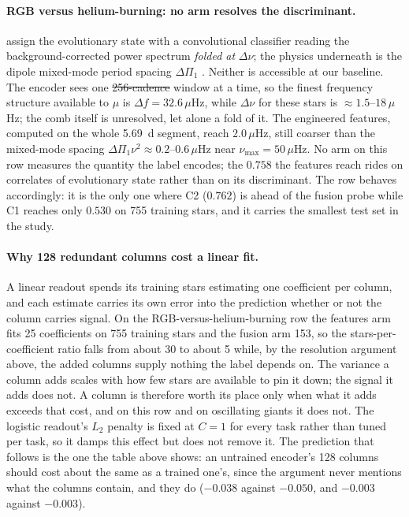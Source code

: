 \documentclass{article}
\makeatletter
\providecommand{\DIFaddtex}[1]{{\protect\color{blue}\uwave{#1}}} %
\providecommand{\DIFdeltex}[1]{{\protect\color{red}\sout{#1}}} %
\providecommand{\DIFaddbegin}{} %
\providecommand{\DIFaddend}{} %
\providecommand{\DIFdelbegin}{} %
\providecommand{\DIFdelend}{} %
\providecommand{\DIFadd}[1]{\texorpdfstring{\DIFaddtex{#1}}{#1}} %
\providecommand{\DIFdel}[1]{\texorpdfstring{\DIFdeltex{#1}}{}} %
\providecommand{\DIFscaledelfig}{0.5}
\newlength{\DIFdelgraphicswidth} %
\newlength{\DIFdelgraphicsheight} %
\providecommand{\DIFaddincludegraphics}[2][]{{\color{blue}\fbox{\DIFOincludegraphics[#1]{#2}}}} %
\providecommand{\DIFdelincludegraphics}[2][]{%
\sbox{\DIFdelgraphicsbox}{\DIFOincludegraphics[#1]{#2}}%
\settoboxwidth{\DIFdelgraphicswidth}{\DIFdelgraphicsbox} %
\settoboxtotalheight{\DIFdelgraphicsheight}{\DIFdelgraphicsbox} %
\scalebox{\DIFscaledelfig}{%
\parbox[b]{\DIFdelgraphicswidth}{\usebox{\DIFdelgraphicsbox}\\[-\baselineskip] \rule{\DIFdelgraphicswidth}{0em}}\llap{\resizebox{\DIFdelgraphicswidth}{\DIFdelgraphicsheight}{%
\setlength{\unitlength}{\DIFdelgraphicswidth}%
\begin{picture}(1,1)%
\thicklines\linethickness{2pt} %
{\color[rgb]{1,0,0}\put(0,0){\framebox(1,1){}}}%
{\color[rgb]{1,0,0}\put(0,0){\line( 1,1){1}}}%
{\color[rgb]{1,0,0}\put(0,1){\line(1,-1){1}}}%
\end{picture}%
}\hspace*{3pt}}} %
} %
\DeclareRobustCommand{\DIFaddbegin}{\DIFOaddbegin \let\includegraphics\DIFaddincludegraphics} %
\DeclareRobustCommand{\DIFaddend}{\DIFOaddend \let\includegraphics\DIFOincludegraphics} %
\DeclareRobustCommand{\DIFdelbegin}{\DIFOdelbegin \let\includegraphics\DIFdelincludegraphics} %
\DeclareRobustCommand{\DIFdelend}{\DIFOaddend \let\includegraphics\DIFOincludegraphics} %
\let\sout@orig\sout %
\renewcommand{\sout}[1]{\ifmmode\text{\sout@orig{\ensuremath{#1}}}\else\sout@orig{#1}\fi} %
\makeatother
\begin{document}
\paragraph{RGB versus helium-burning: no arm resolves the discriminant.} \citet{sreenivas2026} assign
the evolutionary state with a convolutional classifier reading the background-corrected power spectrum
\emph{folded at} $\Delta\nu$; the physics underneath is the dipole mixed-mode period spacing
$\Delta\Pi_{1}$ \citep{bedding2011}. Neither is accessible at our baseline. The encoder sees one
\DIFdelbegin \DIFdel{256-cadence }\DIFdelend \DIFaddbegin \DIFadd{256-point }\DIFaddend window at a time, so the finest frequency structure available to $\mu$ is
$\Delta f = 32.6\,\mu$Hz, while $\Delta\nu$ for these stars is $\approx 1.5$--$18\,\mu$Hz; the comb
itself is unresolved, let alone a fold of it. The engineered features, computed on the whole 5.69 \DIFaddbegin \DIFadd{or 7.11}\DIFaddend \,d
segment, reach \DIFdelbegin \DIFdel{$2.0\,\mu$}\DIFdelend \DIFaddbegin \DIFadd{$2.0$ or $1.6\,\mu$}\DIFaddend Hz, still coarser than the mixed-mode spacing
$\Delta\Pi_{1}\nu^{2} \approx 0.2$--$0.6\,\mu$Hz near $\nu_{\max} = 50\,\mu$Hz. No arm on this row
measures the quantity the label encodes; the $0.758$ the features reach rides on correlates of
evolutionary state rather than on its discriminant. The row behaves accordingly: it is the only one
where C2 ($0.762$) is ahead of the fusion probe while C1 reaches only $0.530$ on 755 training stars,
and it carries the smallest test set in the study.

\paragraph{Why 128 redundant columns cost a linear fit.} A linear readout spends its training stars
estimating one coefficient per column, and each estimate carries its own error into the prediction
whether or not the column carries signal. On the RGB-versus-helium-burning row the features arm fits
25 coefficients on 755 training stars and the fusion arm 153, so the stars-per-coefficient ratio
falls from about 30 to about 5 while, by the resolution argument above, the added columns supply
nothing the label depends on. The variance a column adds scales with how few stars are available to
pin it down; the signal it adds does not. A column is therefore worth its place only when what it
adds exceeds that cost, and on this row and on oscillating giants it does not. The logistic readout's
$L_{2}$ penalty is fixed at $C = 1$ for every task rather than tuned per task, so it damps this effect
but does not remove it. The prediction that follows is the one the table above shows: an untrained
encoder's 128 columns should cost about the same as a trained one's, since the argument never
mentions what the columns contain, and they do ($-0.038$ against $-0.050$, and $-0.003$ against
$-0.003$).
\end{document}
